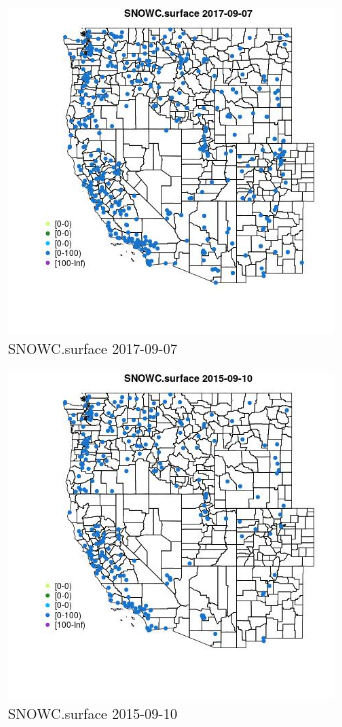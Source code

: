 \begin{figure} 
\centering  
\includegraphics[width=0.77\textwidth]{Code_Outputs/Report_ML_input_PM25_Step4_part_e_de_duplicated_aves_compiled_2019-05-20wNAs_MapObsSNOWCsurface2017-09-07.jpg} 
\caption{\label{fig:Report_ML_input_PM25_Step4_part_e_de_duplicated_aves_compiled_2019-05-20wNAsMapObsSNOWCsurface2017-09-07}SNOWC.surface 2017-09-07} 
\end{figure} 
 

\begin{figure} 
\centering  
\includegraphics[width=0.77\textwidth]{Code_Outputs/Report_ML_input_PM25_Step4_part_e_de_duplicated_aves_compiled_2019-05-20wNAs_MapObsSNOWCsurface2015-09-10.jpg} 
\caption{\label{fig:Report_ML_input_PM25_Step4_part_e_de_duplicated_aves_compiled_2019-05-20wNAsMapObsSNOWCsurface2015-09-10}SNOWC.surface 2015-09-10} 
\end{figure} 
 

